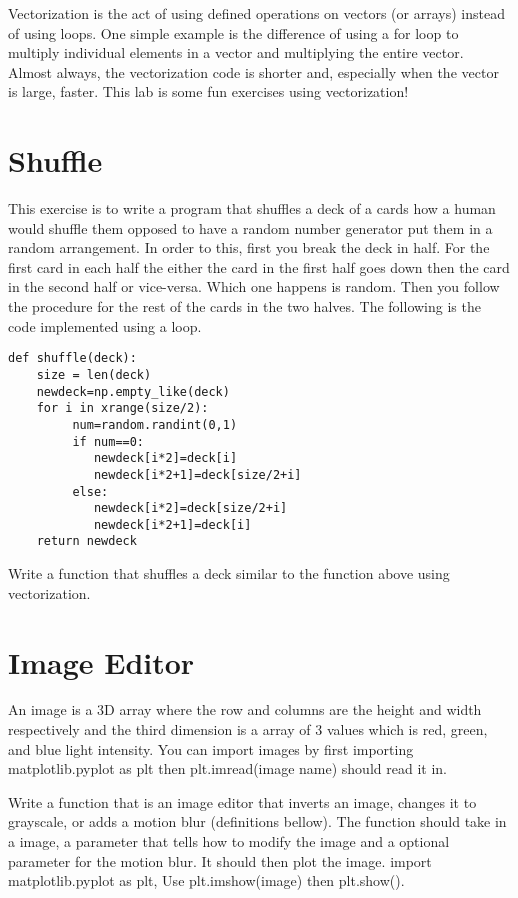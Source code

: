 \label{lab:Python_Vectorization}

Vectorization is the act of using defined operations on vectors (or arrays) instead of using loops. 
One simple example is the difference of using a for loop to multiply individual elements 
in a vector and multiplying the entire vector. 
Almost always, the vectorization code is shorter and, especially when the vector is large, faster.
This lab is some fun exercises using vectorization!

\section*{Shuffle}
This exercise is to write a program that shuffles a deck of a cards how a human 
would shuffle them opposed to have a random number generator put them in a random arrangement. 
In order to this, first you break the deck in half. 
For the first card in each half the either the card in the first half goes down then 
the card in the second half or vice-versa. Which one happens is random. 
Then you follow the procedure for the rest of the cards in the two halves. 
The following is the code implemented using a loop. 
\begin{lstlisting}
def shuffle(deck):
    size = len(deck)
    newdeck=np.empty_like(deck)
    for i in xrange(size/2):
         num=random.randint(0,1)
         if num==0:
            newdeck[i*2]=deck[i]
            newdeck[i*2+1]=deck[size/2+i]
         else:
            newdeck[i*2]=deck[size/2+i]
            newdeck[i*2+1]=deck[i]
    return newdeck
\end{lstlisting}

\begin{problem}
Write a function that shuffles a deck similar to the function above using vectorization.
\end{problem}

\section*{Image Editor}
An image is a 3D array where the row and columns are the height and width respectively 
and the third dimension is a array of 3 values which is red, green, and blue light intensity. 
You can import images by first importing matplotlib.pyplot as plt then plt.imread(image name) should read it in.

\begin{problem}
Write a function that is an image editor that inverts an image, changes it to grayscale, 
or adds a motion blur (definitions bellow). 
The function should take in a image, a parameter that tells how to modify the image 
and a optional parameter for the motion blur. It should then plot the image. 
import matplotlib.pyplot as plt, Use plt.imshow(image) then plt.show().
\end{problem}

